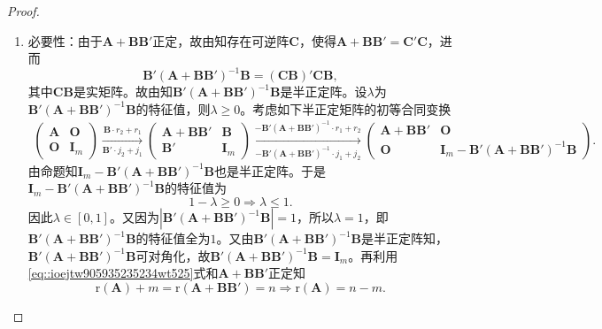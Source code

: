 \documentclass[../../main.tex]{subfiles}%
\begin{document}
\begin{proof}
\begin{enumerate}[(1)]
\item {\heiti 必要性：}由于$\boldsymbol{A}+\boldsymbol{BB}'$正定，故由知存在可逆阵$\boldsymbol{C}$，使得$\boldsymbol{A}+\boldsymbol{BB}'=\boldsymbol{C}'\boldsymbol{C}$，进而
$$\boldsymbol{B}'\left( \boldsymbol{A}+\boldsymbol{BB}' \right) ^{-1}\boldsymbol{B}=\left( \boldsymbol{CB} \right) '\boldsymbol{CB},$$
其中$\boldsymbol{CB}$是实矩阵。故由知$\boldsymbol{B}'\left( \boldsymbol{A}+\boldsymbol{BB}' \right) ^{-1}\boldsymbol{B}$是半正定阵。设$\lambda$为$\boldsymbol{B}'\left( \boldsymbol{A}+\boldsymbol{BB}' \right) ^{-1}\boldsymbol{B}$的特征值，则$\lambda \geqslant 0$。考虑如下半正定矩阵的初等合同变换
\begin{align}
\begin{pmatrix} 
\boldsymbol{A} & \boldsymbol{O} \\ 
\boldsymbol{O} & \boldsymbol{I}_m 
\end{pmatrix} 
\xrightarrow[\boldsymbol{B}' \cdot j_2 + j_1]{\boldsymbol{B} \cdot r_2 + r_1} 
\begin{pmatrix} 
\boldsymbol{A} + \boldsymbol{BB}' & \boldsymbol{B} \\ 
\boldsymbol{B}' & \boldsymbol{I}_m 
\end{pmatrix} 
\xrightarrow[-\boldsymbol{B}'(\boldsymbol{A} + \boldsymbol{BB}')^{-1} \cdot j_1 + j_2]{-\boldsymbol{B}'(\boldsymbol{A} + \boldsymbol{BB}')^{-1} \cdot r_1 + r_2} 
\begin{pmatrix} 
\boldsymbol{A} + \boldsymbol{BB}' & \boldsymbol{O} \\ 
\boldsymbol{O} & \boldsymbol{I}_m - \boldsymbol{B}'(\boldsymbol{A} + \boldsymbol{BB}')^{-1}\boldsymbol{B} 
\end{pmatrix}. \label{eq::ioejtw905935235234wt525}
\end{align}
由命题知$\boldsymbol{I}_m-\boldsymbol{B}'\left( \boldsymbol{A}+\boldsymbol{BB}' \right) ^{-1}\boldsymbol{B}$也是半正定阵。于是$\boldsymbol{I}_m-\boldsymbol{B}'\left( \boldsymbol{A}+\boldsymbol{BB}' \right) ^{-1}\boldsymbol{B}$的特征值为
$$1-\lambda \geqslant 0\Longrightarrow \lambda \leqslant 1.$$
因此$\lambda \in \left[ 0,1 \right]$。又因为$\left| \boldsymbol{B}'\left( \boldsymbol{A}+\boldsymbol{BB}' \right) ^{-1}\boldsymbol{B} \right|=1$，所以$\lambda =1$，即$\boldsymbol{B}'\left( \boldsymbol{A}+\boldsymbol{BB}' \right) ^{-1}\boldsymbol{B}$的特征值全为$1$。又由$\boldsymbol{B}'\left( \boldsymbol{A}+\boldsymbol{BB}' \right) ^{-1}\boldsymbol{B}$是半正定阵知，$\boldsymbol{B}'\left( \boldsymbol{A}+\boldsymbol{BB}' \right) ^{-1}\boldsymbol{B}$可对角化，故$\boldsymbol{B}'\left( \boldsymbol{A}+\boldsymbol{BB}' \right) ^{-1}\boldsymbol{B}=\boldsymbol{I}_m$。再利用\eqref{eq::ioejtw905935235234wt525}式和$\boldsymbol{A}+\boldsymbol{BB}'$正定知
$$\mathrm{r}\left( \boldsymbol{A} \right) +m=\mathrm{r}\left( \boldsymbol{A}+\boldsymbol{BB}' \right) =n\Longrightarrow \mathrm{r}\left( \boldsymbol{A} \right) =n-m.$$



\end{enumerate}
\end{proof}
\end{document}
